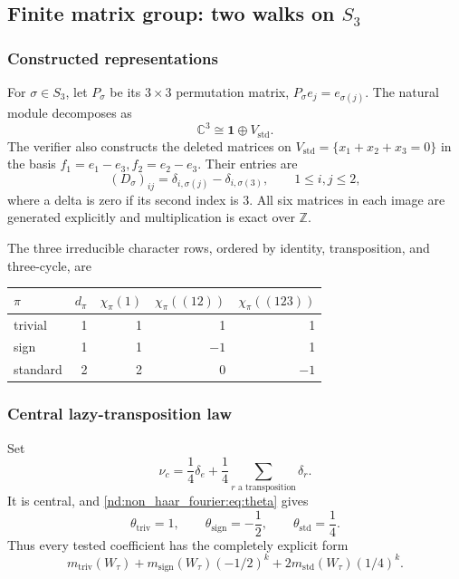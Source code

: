\documentclass[10pt]{article}
\newcommand{\C}{\mathbb C}
\newcommand{\one}{\mathbf 1}
\begin{document}
\subsection{Finite matrix group: two walks on \texorpdfstring{$S_3$}{S3}}
\label{nd:non_haar_fourier:sec:s3}

\subsubsection{Constructed representations}
For $\sigma\in S_3$, let $P_\sigma$ be its $3\times3$ permutation matrix,
$P_\sigma e_j=e_{\sigma(j)}$.  The natural module decomposes as
\begin{equation}\label{nd:non_haar_fourier:eq:natdec}
 \C^3\cong\one\oplus V_{\mathrm{std}}.
\end{equation}
The verifier also constructs the deleted matrices on
$V_{\mathrm{std}}=\{x_1+x_2+x_3=0\}$ in the basis
$f_1=e_1-e_3,f_2=e_2-e_3$.  Their entries are
\begin{equation}\label{nd:non_haar_fourier:eq:deleted}
 (D_\sigma)_{ij}=\delta_{i,\sigma(j)}-\delta_{i,\sigma(3)},
 \qquad 1\le i,j\le2,
\end{equation}
where a delta is zero if its second index is $3$.  All six matrices in each
image are generated explicitly and multiplication is exact over $\mathbb Z$.

The three irreducible character rows, ordered by identity, transposition, and
three-cycle, are
\begin{center}
\begin{tabular}{@{}lrrrr@{}}
\toprule
$\pi$ & $d_\pi$ & $\chi_\pi(1)$ & $\chi_\pi((12))$ & $\chi_\pi((123))$\\
\midrule
trivial & 1 & 1 & 1 & 1\\
sign & 1 & 1 & $-1$ & 1\\
standard & 2 & 2 & 0 & $-1$\\
\bottomrule
\end{tabular}
\end{center}

\subsubsection{Central lazy-transposition law}
Set
\begin{equation}\label{nd:non_haar_fourier:eq:centralstep}
 \nu_c=\frac14\delta_e+\frac14\sum_{r\text{ a transposition}}\delta_r.
\end{equation}
It is central, and \eqref{nd:non_haar_fourier:eq:theta} gives
\begin{equation}\label{nd:non_haar_fourier:eq:s3theta}
 \theta_{\mathrm{triv}}=1,\qquad
 \theta_{\mathrm{sign}}=-\frac12,\qquad
 \theta_{\mathrm{std}}=\frac14.
\end{equation}
Thus every tested coefficient has the completely explicit form
\begin{equation}\label{nd:non_haar_fourier:eq:s3centralformula}
 m_{\mathrm{triv}}(W_\tau)
 +m_{\mathrm{sign}}(W_\tau)(-1/2)^k
 +2m_{\mathrm{std}}(W_\tau)(1/4)^k.
\end{equation}
\end{document}

